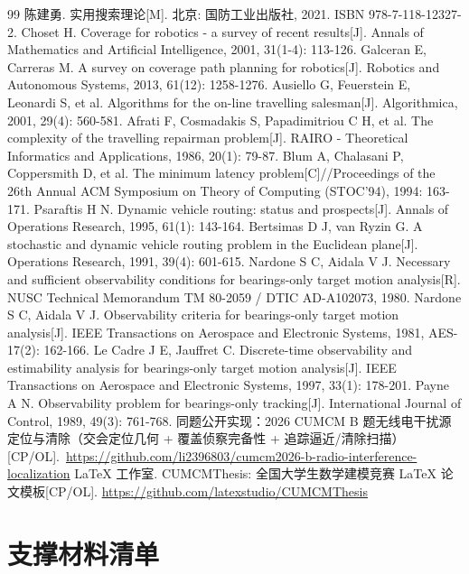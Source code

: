 \documentclass[withoutpreface,bwprint]{cumcmthesis}
\begin{document}
\begin{thebibliography}{99}
 陈建勇. 实用搜索理论[M]. 北京: 国防工业出版社, 2021. ISBN 978-7-118-12327-2.
 Choset H. Coverage for robotics - a survey of recent results[J]. Annals of Mathematics and Artificial Intelligence, 2001, 31(1-4): 113-126.
 Galceran E, Carreras M. A survey on coverage path planning for robotics[J]. Robotics and Autonomous Systems, 2013, 61(12): 1258-1276.
 Ausiello G, Feuerstein E, Leonardi S, et al. Algorithms for the on-line travelling salesman[J]. Algorithmica, 2001, 29(4): 560-581.
 Afrati F, Cosmadakis S, Papadimitriou C H, et al. The complexity of the travelling repairman problem[J]. RAIRO - Theoretical Informatics and Applications, 1986, 20(1): 79-87.
 Blum A, Chalasani P, Coppersmith D, et al. The minimum latency problem[C]//Proceedings of the 26th Annual ACM Symposium on Theory of Computing (STOC'94), 1994: 163-171.
 Psaraftis H N. Dynamic vehicle routing: status and prospects[J]. Annals of Operations Research, 1995, 61(1): 143-164.
 Bertsimas D J, van Ryzin G. A stochastic and dynamic vehicle routing problem in the Euclidean plane[J]. Operations Research, 1991, 39(4): 601-615.
 Nardone S C, Aidala V J. Necessary and sufficient observability conditions for bearings-only target motion analysis[R]. NUSC Technical Memorandum TM 80-2059 / DTIC AD-A102073, 1980.
 Nardone S C, Aidala V J. Observability criteria for bearings-only target motion analysis[J]. IEEE Transactions on Aerospace and Electronic Systems, 1981, AES-17(2): 162-166.
 Le Cadre J E, Jauffret C. Discrete-time observability and estimability analysis for bearings-only target motion analysis[J]. IEEE Transactions on Aerospace and Electronic Systems, 1997, 33(1): 178-201.
 Payne A N. Observability problem for bearings-only tracking[J]. International Journal of Control, 1989, 49(3): 761-768.
 同题公开实现：2026 CUMCM B 题无线电干扰源定位与清除（交会定位几何 + 覆盖侦察完备性 + 追踪逼近/清除扫描）[CP/OL].\
\url{https://github.com/li2396803/cumcm2026-b-radio-interference-localization}
\bibitem{cumcmthesis} LaTeX 工作室. CUMCMThesis: 全国大学生数学建模竞赛 LaTeX 论文模板[CP/OL]. \url{https://github.com/latexstudio/CUMCMThesis}
\end{thebibliography}

\appendix
\section{支撑材料清单}
\end{document}
